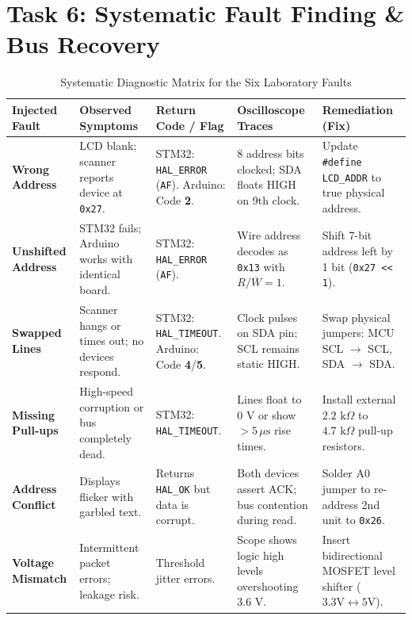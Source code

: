 \documentclass[11pt,a4paper,oneside]{report}
\begin{document}
\chapter{Task 6: Systematic Fault Finding \& Bus Recovery}

\begin{table}[h!]
\centering
\scriptsize
\caption{Systematic Diagnostic Matrix for the Six Laboratory Faults}
\vspace{4pt}
\begin{tabularx}{\textwidth}{p{2.2cm} p{2.4cm} p{2.2cm} p{2.5cm} X}
\toprule
\textbf{Injected Fault} & \textbf{Observed Symptoms} & \textbf{Return Code / Flag} & \textbf{Oscilloscope Traces} & \textbf{Remediation (Fix)} \\
\midrule
\textbf{Wrong Address} & LCD blank; scanner reports device at \texttt{0x27}. & STM32: \texttt{HAL\_ERROR} (\texttt{AF}). \newline Arduino: Code \textbf{2}. & 8 address bits clocked; SDA floats HIGH on 9th clock. & Update \texttt{\#define LCD\_ADDR} to true physical address. \\
\textbf{Unshifted Address} & STM32 fails; Arduino works with identical board. & STM32: \texttt{HAL\_ERROR} (\texttt{AF}). & Wire address decodes as \texttt{0x13} with $R/\overline{W}=1$. & Shift 7-bit address left by 1 bit (\texttt{0x27 <{}< 1}). \\
\textbf{Swapped Lines} & Scanner hangs or times out; no devices respond. & STM32: \texttt{HAL\_TIMEOUT}. \newline Arduino: Code \textbf{4}/\textbf{5}. & Clock pulses on SDA pin; SCL remains static HIGH. & Swap physical jumpers: MCU SCL $\to$ SCL, SDA $\to$ SDA. \\
\textbf{Missing Pull-ups} & High-speed corruption or bus completely dead. & STM32: \texttt{HAL\_TIMEOUT}. & Lines float to $0\text{ V}$ or show $> 5\,\mu\text{s}$ rise times. & Install external $2.2\text{ k}\Omega$ to $4.7\text{ k}\Omega$ pull-up resistors. \\
\textbf{Address Conflict} & Displays flicker with garbled text. & Returns \texttt{HAL\_OK} but data is corrupt. & Both devices assert ACK; bus contention during read. & Solder A0 jumper to re-address 2nd unit to \texttt{0x26}. \\
\textbf{Voltage Mismatch} & Intermittent packet errors; leakage risk. & Threshold jitter errors. & Scope shows logic high levels overshooting $3.6\text{ V}$. & Insert bidirectional MOSFET level shifter ($3.3\text{V} \leftrightarrow 5\text{V}$). \\
\bottomrule
\end{tabularx}
\end{table}
\end{document}

